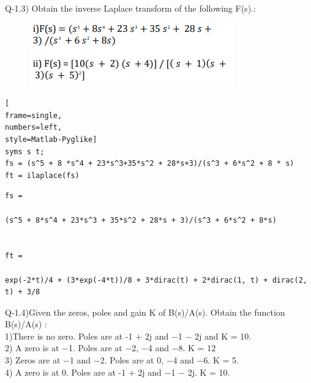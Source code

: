 \documentclass[conference]{IEEEtran}
\begin{document}
Q-1.3) Obtain the inverse Laplace transform of 
the following F(s).:
\begin{figure}[h!]
    \centering
    \includegraphics[width=\linewidth]{q1.3.png}
    \label{fig:my_label}
\end{figure}

\begin{lstlisting}[
frame=single,
numbers=left,
style=Matlab-Pyglike]
syms s t;
fs = (s^5 + 8 *s^4 + 23*s^3+35*s^2 + 28*s+3)/(s^3 + 6*s^2 + 8 * s) 
ft = ilaplace(fs)

\end{lstlisting}
\begin{verbatim}
fs =
 
(s^5 + 8*s^4 + 23*s^3 + 35*s^2 + 28*s + 3)/(s^3 + 6*s^2 + 8*s)
 
 
ft =
 
exp(-2*t)/4 + (3*exp(-4*t))/8 + 3*dirac(t) + 2*dirac(1, t) + dirac(2, t) + 3/8
\end{verbatim}
Q-1.4)Given the zeros, poles and gain K of 
B(s)/A(s). Obtain the function B(s)/A(s) :\\
1)There is no zero. Poles are at -1 + 2j and −1 −
2j and K = 10. \\
2) A zero is at −1. Poles are at −2, −4 and −8. K = 
12\\
3) Zeros are at −1 and −2. Poles are at 0, −4 and 
−6. K = 5.\\
4) A zero is at 0. Poles are at -1 + 2j and −1 − 2j. 
K = 10.
\end{document}
